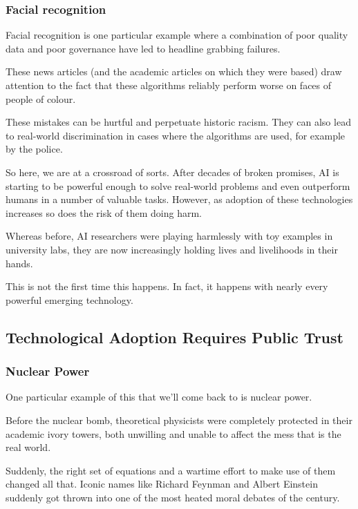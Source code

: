 \documentclass[
]{book}
\theoremstyle{definition}
\theoremstyle{definition}
\theoremstyle{definition}
\theoremstyle{definition}
\theoremstyle{remark}
\begin{document}
\hypertarget{facial-recognition}{%
\subsubsection{Facial recognition}\label{facial-recognition}}

Facial recognition is one particular example where a combination of poor quality data and poor governance have led to headline grabbing failures.

These news articles (and the academic articles on which they were based) draw attention to the fact that these algorithms reliably perform worse on faces of people of colour.

These mistakes can be hurtful and perpetuate historic racism. They can also lead to real-world discrimination in cases where the algorithms are used, for example by the police.

So here, we are at a crossroad of sorts. After decades of broken promises,
AI is starting to be powerful enough to solve real-world problems and even outperform humans in a number of valuable tasks. However, as adoption of these technologies increases so does the risk of them doing harm.

Whereas before, AI researchers were playing harmlessly with toy examples
in university labs, they are now increasingly holding lives and livelihoods in their hands.

This is not the first time this happens. In fact, it happens with nearly
every powerful emerging technology.

\hypertarget{technological-adoption-requires-public-trust}{%
\subsection{Technological Adoption Requires Public Trust}\label{technological-adoption-requires-public-trust}}

\hypertarget{nuclear-power}{%
\subsubsection{Nuclear Power}\label{nuclear-power}}

One particular example of this that we'll come back to is nuclear power.

Before the nuclear bomb, theoretical physicists were completely
protected in their academic ivory towers, both unwilling and unable to affect
the mess that is the real world.

Suddenly, the right set of equations and a wartime effort to make use of
them changed all that. Iconic names like Richard Feynman and Albert Einstein suddenly got thrown into one of the most heated moral debates of the century.
\end{document}

